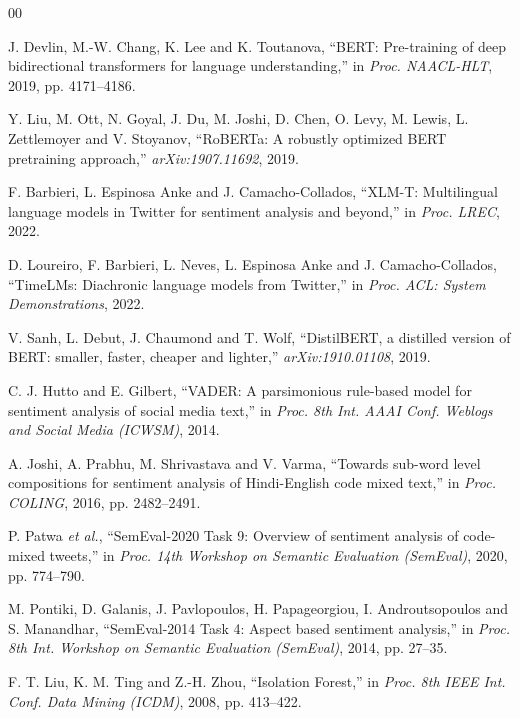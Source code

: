 \documentclass[conference]{IEEEtran}
\begin{document}
\begin{thebibliography}{00}

 J. Devlin, M.-W. Chang, K. Lee and K. Toutanova, ``BERT:
Pre-training of deep bidirectional transformers for language understanding,'' in
\emph{Proc. NAACL-HLT}, 2019, pp. 4171--4186.

 Y. Liu, M. Ott, N. Goyal, J. Du, M. Joshi, D. Chen, O. Levy, M. Lewis, L. Zettlemoyer and V. Stoyanov, ``RoBERTa: A robustly optimized BERT pretraining approach,'' \emph{arXiv:1907.11692}, 2019.

 F. Barbieri, L. Espinosa Anke and J. Camacho-Collados, ``XLM-T: Multilingual language models in Twitter for sentiment analysis and beyond,'' in \emph{Proc. LREC}, 2022.

 D. Loureiro, F. Barbieri, L. Neves, L. Espinosa Anke and J. Camacho-Collados, ``TimeLMs: Diachronic language models from Twitter,'' in \emph{Proc. ACL: System Demonstrations}, 2022.

 V. Sanh, L. Debut, J. Chaumond and T. Wolf, ``DistilBERT, a
distilled version of BERT: smaller, faster, cheaper and lighter,''
\emph{arXiv:1910.01108}, 2019.

 C. J. Hutto and E. Gilbert, ``VADER: A parsimonious rule-based
model for sentiment analysis of social media text,'' in \emph{Proc. 8th Int. AAAI Conf.
Weblogs and Social Media (ICWSM)}, 2014.

 A. Joshi, A. Prabhu, M. Shrivastava and V. Varma, ``Towards
sub-word level compositions for sentiment analysis of Hindi-English code mixed text,'' in
\emph{Proc. COLING}, 2016, pp. 2482--2491.

 P. Patwa \emph{et al.}, ``SemEval-2020 Task 9: Overview of
sentiment analysis of code-mixed tweets,'' in \emph{Proc. 14th Workshop on Semantic
Evaluation (SemEval)}, 2020, pp. 774--790.

 M. Pontiki, D. Galanis, J. Pavlopoulos, H. Papageorgiou,
I. Androutsopoulos and S. Manandhar, ``SemEval-2014 Task 4: Aspect based sentiment
analysis,'' in \emph{Proc. 8th Int. Workshop on Semantic Evaluation (SemEval)}, 2014,
pp. 27--35.

 F. T. Liu, K. M. Ting and Z.-H. Zhou, ``Isolation Forest,'' in
\emph{Proc. 8th IEEE Int. Conf. Data Mining (ICDM)}, 2008, pp. 413--422.


\end{thebibliography}
\end{document}
